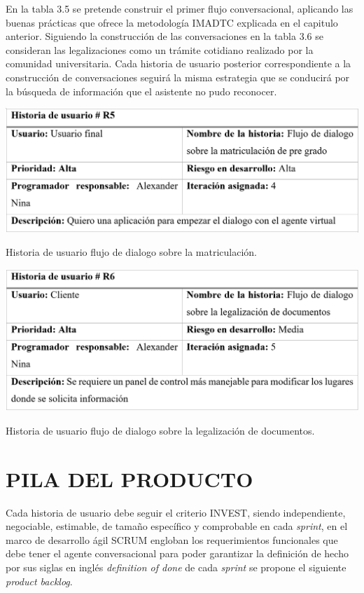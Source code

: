 \documentclass[letter, openright, 12pt]{book}
\begin{document}
\par En la tabla 3.5 se pretende construir el primer flujo conversacional, aplicando las buenas prácticas que ofrece la metodología IMADTC explicada en el capitulo anterior. Siguiendo la construcción de las conversaciones en la tabla 3.6 se consideran las legalizaciones como un trámite cotidiano realizado por la comunidad universitaria.
Cada historia de usuario posterior correspondiente a la construcción de conversaciones seguirá la misma estrategia que se conducirá por la búsqueda de información que el asistente no pudo reconocer. 

\begin{table}[!ht]
\includegraphics[width=1\textwidth]{tabla3_5}
\caption{Historia de usuario flujo de dialogo sobre la matriculación. } 
\label{tab:tabla3_5} 
\end{table}

\begin{table}[!ht]
\includegraphics[width=1\textwidth]{tabla3_6}
\caption{Historia de usuario flujo de dialogo sobre la legalización de documentos. } 
\label{tab:tabla3_6} 
\end{table}

\section{PILA DEL PRODUCTO}

Cada historia de usuario debe seguir el criterio INVEST, siendo independiente, negociable, estimable, de tamaño específico y comprobable en cada {\it sprint}, en el marco de desarrollo ágil SCRUM engloban los requerimientos funcionales que debe tener el agente conversacional para poder garantizar la definición de hecho por sus siglas en inglés {\it definition of done} de cada {\it sprint} se propone el siguiente {\it product backlog}.
\end{document}
